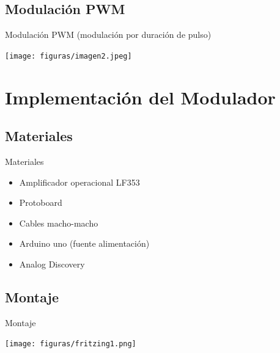 \documentclass{if-beamer}
\begin{document}
\subsection{Modulación PWM}
\begin{frame}{Modulación PWM (modulación por duración de pulso)}
   
    
    \begin{center}
        \texttt{[image: figuras/imagen2.jpeg]}
    \end{center}{}
    
\end{frame}{}
\section{Implementación del Modulador}

\subsection{Materiales}

\begin{frame}{Materiales}
    \begin{center}
        \begin{itemize}
            \item Amplificador operacional LF353
            \item Protoboard 
            \item Cables macho-macho
            \item Arduino uno (fuente alimentación)
            \item Analog Discovery
        \end{itemize}{}
    \end{center}{}    
        
\end{frame}{}

\subsection{Montaje}
\begin{frame}{Montaje}

\begin{center}
    \texttt{[image: figuras/fritzing1.png]}
\end{center}{}

\end{frame}{}
\end{document}
